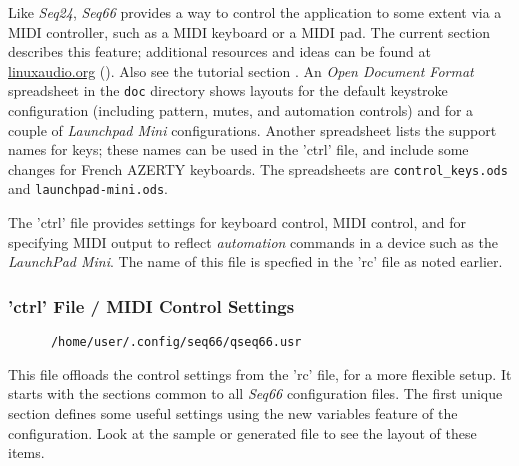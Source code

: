    Like \textsl{Seq24}, \textsl{Seq66} provides a way to control the
   application to some extent via a MIDI controller, such as a MIDI keyboard or
   a MIDI pad.  The current section describes this feature;
   additional resources and ideas can be found at \url{linuxaudio.org}
   (\cite{midicontrol}).
   Also see the tutorial section .
   An \textsl{Open Document Format} spreadsheet in the
   \texttt{doc} directory shows layouts for the default
   keystroke configuration (including pattern, mutes, and automation controls)
   and for a couple of \textsl{Launchpad Mini} configurations.
   Another spreadsheet lists the support names for keys; these names can be used
   in the 'ctrl' file, and include some changes for French AZERTY keyboards.
   The spreadsheets are
   \texttt{control\_keys.ods} and
   \texttt{launchpad-mini.ods}.

   The 'ctrl' file provides settings for keyboard control, MIDI control, and for
   specifying MIDI output to reflect \textsl{automation} commands in a device
   such as the \textsl{LaunchPad Mini}.
   The name of this file is specfied in the 'rc' file as noted earlier.

\subsubsection{'ctrl' File / MIDI Control Settings}
\label{subsubsec:configuration_ctrl_midi_control_settings}

   \begin{verbatim}
      /home/user/.config/seq66/qseq66.usr
   \end{verbatim}

   This file offloads the control settings from the 'rc' file, for a more
   flexible setup. It starts with the sections common to all \textsl{Seq66}
   configuration files.  The first unique section defines some useful settings
   using the new variables feature of the configuration.  Look at the sample or
   generated file to see the layout of these items.

